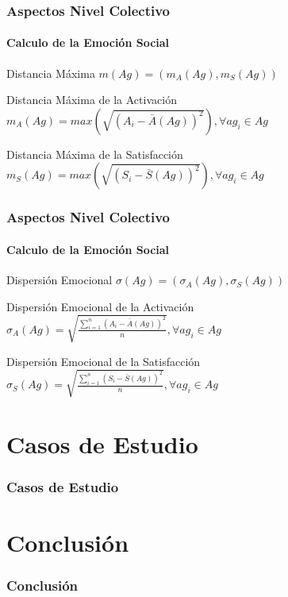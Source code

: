 \documentclass{beamer}
\begin{document}
\begin{frame}
\frametitle{Aspectos Nivel Colectivo}
\framesubtitle{Calculo de la Emoción Social}
\begin{exampleblock}{Distancia Máxima}
$ m(Ag) = (m_A(Ag), m_S(Ag))$
\end{exampleblock}

\begin{exampleblock}{Distancia Máxima de la Activación}
$m_A(Ag) = max\left(\sqrt{(A_i - \bar A(Ag))^2}\right), \forall ag_i \in Ag$
\end{exampleblock}

\begin{exampleblock}{Distancia Máxima de la Satisfacción}
$m_S(Ag) = max\left(\sqrt{(S_i - \bar S(Ag))^2}\right), \forall ag_i \in Ag$
\end{exampleblock}

\end{frame}

\begin{frame}
\frametitle{Aspectos Nivel Colectivo}
\framesubtitle{Calculo de la Emoción Social}
\begin{exampleblock}{Dispersión Emocional}
$ \sigma(Ag) = (\sigma_A(Ag), \sigma_S(Ag))$
\end{exampleblock}

\begin{exampleblock}{Dispersión Emocional de la Activación}
$\sigma_A(Ag) = \sqrt{\frac{\sum_{i=1}^n(A_i - \bar A(Ag))^2}{n}},  \forall ag_i \in Ag$
\end{exampleblock}

\begin{exampleblock}{Dispersión Emocional de la Satisfacción}
$  \sigma_S(Ag) = \sqrt{\frac{\sum_{i=1}^n(S_i - \bar S(Ag))^2}{n}},  \forall ag_i \in Ag$
\end{exampleblock}
\end{frame}

\section{Casos de Estudio}
\begin{frame}
\frametitle{Casos de Estudio}

\end{frame}


\section{Conclusión}
\begin{frame}
\frametitle{Conclusión}

\end{frame}


\ThankYouFrame
\end{document}
